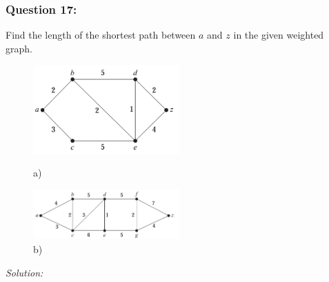 \documentclass[a4paper]{article}
\begin{document}
	\subsubsection*{Question 17:}
	Find the length of the shortest path between $a$ and $z$ in the given weighted graph.
	\begin{figure}[H]
		\begin{minipage}{0.5\textwidth}
			\centering
			\includegraphics[width=0.5\textwidth]{tut917_1.png}
			\caption*{a)}
		\end{minipage}
		\begin{minipage}{0.5\textwidth}
			\centering
			\includegraphics[width=0.5\textwidth]{tut917_2.png}
			\caption*{b)}
		\end{minipage}
	\end{figure}
	\emph{Solution:}
\end{document}
